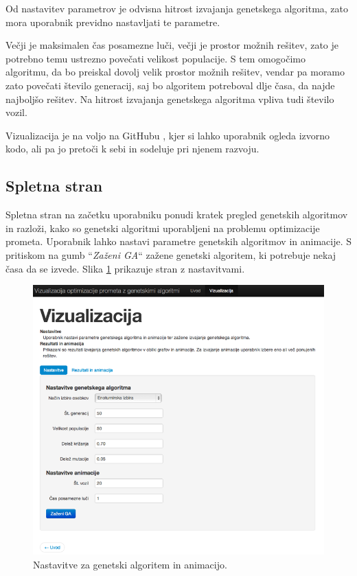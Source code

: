 \documentclass[a4paper, 12pt]{book}
\begin{document}
Od nastavitev parametrov je odvisna hitrost izvajanja genetskega algoritma, zato mora uporabnik previdno nastavljati te parametre.

Ve\v cji je maksimalen \v cas posamezne lu\v ci, ve\v cji je prostor mo\v znih re\v sitev, zato je potrebno temu ustrezno pove\v cati velikost populacije. S tem omogo\v cimo algoritmu, da bo preiskal dovolj velik prostor mo\v znih re\v sitev, vendar pa moramo zato pove\v cati \v stevilo generacij, saj bo algoritem potreboval dlje \v casa, da najde najbolj\v so re\v sitev. Na hitrost izvajanja genetskega algoritma vpliva tudi \v stevilo vozil.

Vizualizacija je na voljo na GitHubu \cite{izvorna koda}, kjer si lahko uporabnik ogleda izvorno kodo, ali pa jo preto\v ci k sebi in sodeluje pri njenem razvoju.

\subsection{Spletna stran}
Spletna stran na za\v cetku uporabniku ponudi kratek pregled genetskih algoritmov in razlo\v zi, kako so genetski algoritmi uporabljeni na problemu optimizacije prometa. Uporabnik lahko nastavi parametre genetskih algoritmov in animacije. S pritiskom na gumb ``\textit{Za\v zeni GA}`` za\v zene genetski algoritem, ki potrebuje nekaj \v casa da se izvede. Slika \ref{fig:vizualizacija-nastavitev parametrov} prikazuje stran z nastavitvami. 

\begin{figure}
\includegraphics[scale=0.50]{nastavitev_parametrov.png}
\caption{Nastavitve za genetski algoritem in animacijo.}
\label{fig:vizualizacija-nastavitev parametrov}
\end{figure}
\end{document}

